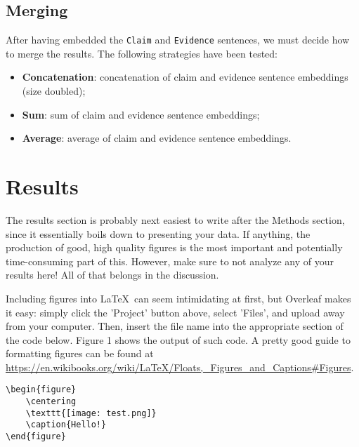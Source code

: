 \documentclass[10pt,twocolumn,letterpaper]{article}
\begin{document}

\subsection{Merging}

After having embedded the \texttt{Claim} and \texttt{Evidence} sentences, we must decide how to merge the results. The following strategies have been tested:
\begin{itemize}
\item \textbf{Concatenation}: concatenation of claim and evidence sentence embeddings (size doubled);
\item \textbf{Sum}: sum of claim and evidence sentence embeddings;
\item \textbf{Average}: average of claim and evidence sentence embeddings.

\end{itemize}

\section{Results}

The results section is probably next easiest to write after the Methods section, since it essentially boils down to presenting your data. If anything, the production of good, high quality figures is the most important and potentially time-consuming part of this. However, make sure to not analyze any of your results here! All of that belongs in the discussion.

Including figures into \LaTeX\ can seem intimidating at first, but Overleaf makes it easy: simply click the 'Project' button above, select 'Files', and upload away from your computer. Then, insert the file name into the appropriate section of the code below.  Figure 1  shows the output of such code. A pretty good guide to formatting figures can be found at \url{https://en.wikibooks.org/wiki/LaTeX/Floats,_Figures_and_Captions#Figures}.
\\

{\scriptsize
\begin{verbatim}
\begin{figure}
    \centering
    \texttt{[image: test.png]}
    \caption{Hello!}
\end{figure}
\end{verbatim}
}
\end{document}
